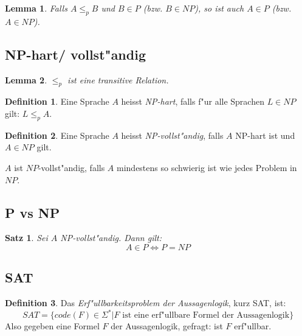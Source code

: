 \documentclass[german, 10pt, a4paper, twocolumn]{scrartcl}
\newtheorem{lemma}{Lemma}[section]
\newtheorem{satz}{Satz}[section]
\theoremstyle{definition}
\newtheorem*{definition}{Definition}
\theoremstyle{example}
\begin{document}
\begin{lemma}
	Falls $A \leq_p B$ und $B \in P$ (bzw. $B \in NP$), so ist auch $A \in P$ (bzw. $A \in NP$).
\end{lemma}

\subsection{NP-hart/ vollst"andig}

\begin{lemma}
	$\leq_p$ ist eine transitive Relation.
\end{lemma}

\begin{definition}
	Eine Sprache $A$ heisst \textit{NP-hart}, falls f"ur alle Sprachen $L \in NP$ gilt: $L \leq_p A$.
\end{definition}

\begin{definition}
	Eine Sprache $A$ heisst \textit{NP-vollst"andig}, falls $A$ NP-hart ist und $A \in NP$ gilt.
\end{definition}

$A$ ist $NP$-vollst"andig, falls $A$ mindestens so schwierig ist wie jedes Problem in $NP$.

\subsection{P vs NP}

\begin{satz}
	Sei $A$ NP-vollst"andig. Dann gilt:
	\begin{displaymath}
		A \in P \Leftrightarrow P = NP
	\end{displaymath}
\end{satz}

\subsection{SAT}

\begin{definition}
	Das \textit{Erf"ullbarkeitsproblem der Aussagenlogik}, kurz SAT, ist:
	\footnotesize
	\begin{displaymath}
		SAT = \{ code(F) \in \Sigma^* | F \text{ ist eine erf"ullbare Formel der Aussagenlogik}\}
	\end{displaymath}
	\normalsize
	Also gegeben eine Formel $F$ der Aussagenlogik, gefragt: ist $F$ erf"ullbar.
\end{definition}
\end{document}
